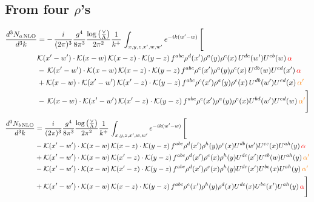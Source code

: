 \documentclass[9pt]{article}
\numberwithin{equation}{section}
\begin{document}
\subsection{From four $\rho$'s}
\begin{align}
    \frac{d^{3}N_{a\,\rm NLO}}{d^{3}k} & = -\,\frac{i}{(2\pi)^{3}}\frac{g^{4}}{8\pi^{3}}\frac{\log{\left(\frac{\vee}{\Lambda}\right)}}{2\pi^{2}} \frac{1}{k^{+}}\,\int_{x,y,z,x^{\prime},w,w^{\prime}}e^{-ik(w^{\prime}-w)}\, \Bigg[\notag \\ &  \mathcal{K}(x'-w')\cdot \mathcal{K}(x-w)\, \mathcal{K}(x-z)\cdot \mathcal{K}(y-z)\, f^{a b c} \rho^{d}(x') \rho^{a}(y) \rho^{c}(x)\,U^{d e}(w') U^{e b}(w)\, {\color{red} \alpha} \nonumber\\
    &  -\,\mathcal{K}(x'-w')\cdot \mathcal{K}(x-w)\, \mathcal{K}(x-z)\cdot \mathcal{K}(y-z)\, f^{a b c} \rho^{e}(x') \rho^{a}(y) \rho^{c}(x)\, U^{d b}(w) U^{e d}(x')\, {\color{red} \alpha}\nonumber\\
    & + \mathcal{K}(x-w)\cdot \mathcal{K}(x'-w')\, \mathcal{K}(x'-z)\cdot \mathcal{K}(y-z)\, f^{a b c} \rho^{c}(x') \rho^{a}(y) \rho^{e}(x)\,U^{d b}(w') U^{e d}(x)\, {\color{orange} \alpha'} \nonumber\\
    & -\,\mathcal{K}(x-w)\cdot \mathcal{K}(x'-w')\, \mathcal{K}(x'-z)\cdot \mathcal{K}(y-z)\, f^{a b c} \rho^{c}(x') \rho^{a}(y) \rho^{e}(x) U^{b d}(w') U^{e d}(w)\, {\color{orange} \alpha'}\Bigg]
\end{align}
\begin{align}
      \frac{d^{3}N_{b\,\rm NLO}}{d^{3}k} & = \frac{i}{(2\pi)^{3}}\frac{g^{4}}{8\pi^{3}}\frac{\log{\left(\frac{\vee}{\Lambda}\right)}}{2\pi^{2}} \frac{1}{k^{+}}\,\int_{x,y,z,x^{\prime},w,w^{\prime}}e^{-ik(w^{\prime}-w)}\, \Bigg[\notag \\ & - \mathcal{K}(x'-w')\cdot \mathcal{K}(x-w)\, \mathcal{K}(x-z)\cdot \mathcal{K}(y-z)\, f^{a b c} \rho^{d}(x') \rho^{h}(y) \rho^{e}(x) U^{d b}(w') U^{e c}(x) U^{a h}(y)\, {\color{red} \alpha}\nonumber\\
    &+ \mathcal{K}(x'-w')\cdot \mathcal{K}(x-w)\,\mathcal{K}(x'-z)\cdot \mathcal{K}(y-z)\, f^{a b c} \rho^{d}(x') \rho^{e}(x) \rho^{h}(y) U^{d c}(x') U^{e b}(w) U^{a h}(y)\, {\color{orange} \alpha'}\nonumber\\
    &- \mathcal{K}(x'-w')\cdot \mathcal{K}(x-w)\,\mathcal{K}(x'-z)\cdot \mathcal{K}(y-z)\, f^{a b c} \rho^{d}(x') \rho^{e}(x) \rho^{h}(y) U^{d c}(x') U^{b e}(x) U^{a h}(y)\, {\color{orange} \alpha'}\nonumber\\
    &+  \mathcal{K}(x'-w')\cdot \mathcal{K}(x-w)\, \mathcal{K}(x-z)\cdot \mathcal{K}(y-z)\, f^{a b c} \rho^{e}(x') \rho^{h}(y) \rho^{d}(x) U^{d c}(x) U^{b e}(x') U^{a h}(y)\, {\color{red} \alpha} \Bigg]
\end{align}
\end{document}
